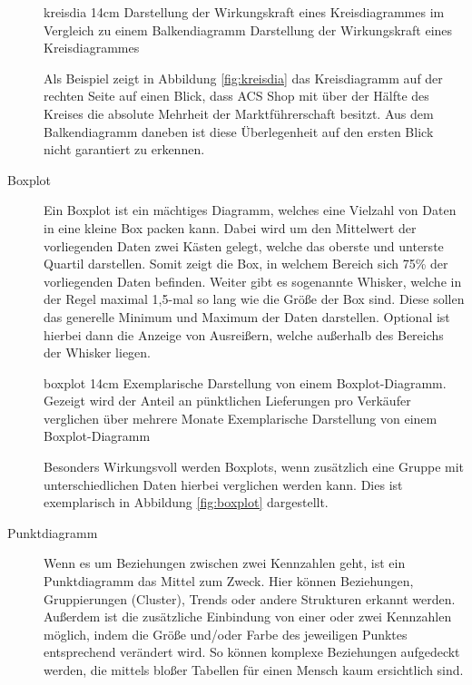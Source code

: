 \begin{description}
\bild
{kreisdia}
{14cm}
{Darstellung der Wirkungskraft eines Kreisdiagrammes im Vergleich zu einem Balkendiagramm}
{Darstellung der Wirkungskraft eines Kreisdiagrammes}

Als Beispiel zeigt in Abbildung \ref{fig:kreisdia} das Kreisdiagramm auf der rechten Seite auf einen Blick, dass \glqq ACS Shop\grqq{} mit über der Hälfte des Kreises die absolute Mehrheit der Marktführerschaft besitzt.
Aus dem Balkendiagramm daneben ist diese Überlegenheit auf den ersten Blick nicht garantiert zu erkennen.

\item[Boxplot] Ein Boxplot ist ein mächtiges Diagramm, welches eine Vielzahl von Daten in eine kleine \glqq Box\grqq{} packen kann.
Dabei wird um den Mittelwert der vorliegenden Daten zwei Kästen gelegt, welche das oberste und unterste Quartil darstellen.
Somit zeigt die \glqq Box\grqq{}, in welchem Bereich sich 75\% der vorliegenden Daten befinden.
Weiter gibt es sogenannte \glqq Whisker\grqq{}, welche in der Regel maximal 1,5-mal so lang wie die Größe der Box sind. 
Diese sollen das generelle Minimum und Maximum der Daten darstellen.
Optional ist hierbei dann die Anzeige von Ausreißern, welche außerhalb des Bereichs der Whisker liegen.

\bild
{boxplot}
{14cm}
{Exemplarische Darstellung von einem Boxplot-Diagramm. Gezeigt wird der Anteil an pünktlichen Lieferungen pro Verkäufer verglichen über mehrere Monate}
{Exemplarische Darstellung von einem Boxplot-Diagramm}

Besonders Wirkungsvoll werden Boxplots, wenn zusätzlich eine Gruppe mit unterschiedlichen Daten hierbei verglichen werden kann.
Dies ist exemplarisch in Abbildung \ref{fig:boxplot} dargestellt.
\item[Punktdiagramm] Wenn es um Beziehungen zwischen zwei Kennzahlen geht, ist ein Punktdiagramm das Mittel zum Zweck.
Hier können Beziehungen, Gruppierungen (Cluster), Trends oder andere Strukturen erkannt werden.
Außerdem ist die zusätzliche Einbindung von einer oder zwei Kennzahlen möglich, indem die Größe und/oder Farbe des jeweiligen Punktes entsprechend verändert wird.
So können komplexe Beziehungen aufgedeckt werden, die mittels bloßer Tabellen für einen Mensch kaum ersichtlich sind.
\end{description}

